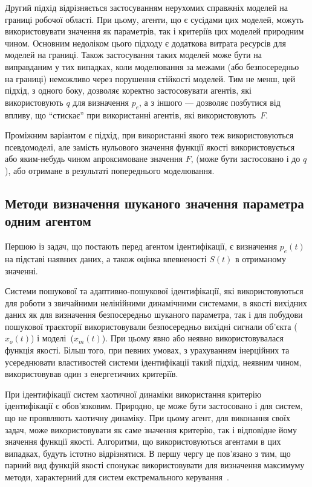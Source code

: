 Другий підхід відрізняється застосуванням нерухомих
справжніх моделей на границі робочої області. При цьому,
агенти, що є сусідами цих моделей, можуть використовувати
значення як параметрів, так і критеріїв цих моделей природним
чином. Основним недоліком цього підходу є додаткова витрата
ресурсів для моделей на границі. Також застосування таких
моделей може бути на виправданим у  тих випадках, коли моделювання за межами
(або безпосередньо на границі) неможливо через порушення
стійкості моделей. Тим не менш, цей підхід, з одного боку,
дозволяє коректно застосовувати агентів, які використовують
$q$ для визначення $p_e$,
а з іншого --- дозволяє позбутися від впливу, що ``стискає'' при
використанні агентів, які використовують~$F$.

Проміжним варіантом є підхід, при використанні якого
теж використовуються псевдомоделі, але замість нульового
значення функції якості використовується або яким-небудь чином
апроксимоване значення
$ F $, (може бути застосовано і до $q$),
або отримане в результаті попереднього моделювання.




\subsection{Методи визначення шуканого значення параметра одним агентом} %

Першою із задач, що постають перед агентом ідентифікації, є визначення $p_e(t)$
на підставі наявних даних, а також оцінка впевненості $S(t)$ в
отриманому значенні.

Системи пошукової та адаптивно-пошукової ідентифікації,
які використовуються для роботи з звичайними нелінійними
динамічними системами, в якості вихідних даних як для визначення
безпосередньо шуканого параметра, так і для побудови пошукової
траєкторії використовували безпосередньо вихідні сигнали
об'єкта ($x_o(t)$) і моделі~($x_m(t)$).
При цьому явно або неявно використовувалася функція
якості. Більш того, при певних умовах, з урахуванням інерційних
та усереднювати властивостей системи ідентифікації такий
підхід, неявним чином, використовував один з енергетичних
критеріїв.

При ідентифікації систем хаотичної динаміки використання
критерію ідентифікації є обов'язковим. Природно, це може
бути застосовано і для систем, що не проявляють хаотичну
динаміку. При цьому агент, для виконання своїх задач, може
використовувати як саме значення критерію, так і відповідне
йому значення функції якості. Алгоритми, що використовуються
агентами в цих випадках, будуть істотно відрізнятися. В першу
чергу це пов'язано з тим, що парний вид функцій якості спонукає
використовувати для визначення максимуму методи, характерний
для систем екстремального керування~\cite{rastr_seu}.

